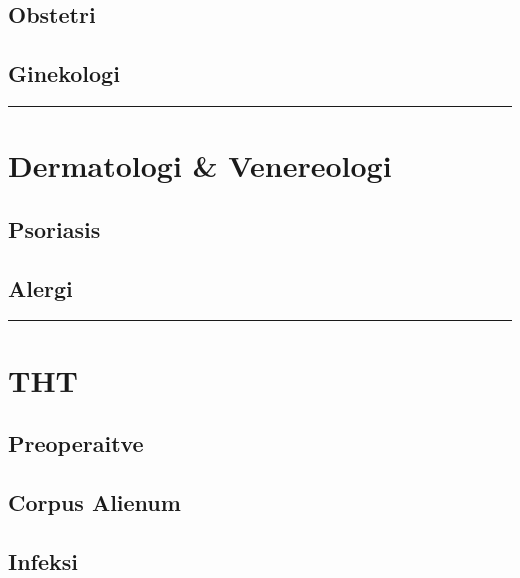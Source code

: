 \documentclass[
]{book}
\begin{document}
\hypertarget{obstetri}{%
\subsection{Obstetri}\label{obstetri}}

\hypertarget{ginekologi}{%
\subsection{Ginekologi}\label{ginekologi}}

\begin{center}\rule{0.5\linewidth}{0.5pt}\end{center}

\hypertarget{dermatologi-venereologi}{%
\section{Dermatologi \& Venereologi}\label{dermatologi-venereologi}}

\hypertarget{psoriasis}{%
\subsection{Psoriasis}\label{psoriasis}}

\hypertarget{alergi}{%
\subsection{Alergi}\label{alergi}}

\begin{center}\rule{0.5\linewidth}{0.5pt}\end{center}

\hypertarget{tht}{%
\section{THT}\label{tht}}

\hypertarget{preoperaitve}{%
\subsection{Preoperaitve}\label{preoperaitve}}

\hypertarget{corpus-alienum}{%
\subsection{Corpus Alienum}\label{corpus-alienum}}

\hypertarget{infeksi-4}{%
\subsection{Infeksi}\label{infeksi-4}}
\end{document}
